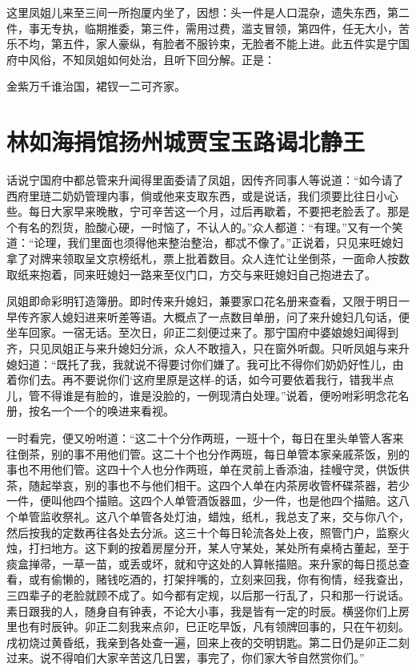 这里凤姐儿来至三间一所抱厦内坐了，因想：头一件是人口混杂，遗失东西，第二件，事无专执，临期推委，第三件，需用过费，滥支冒领，第四件，任无大小，苦乐不均，第五件，家人豪纵，有脸者不服钤束，无脸者不能上进。此五件实是宁国府中风俗，不知凤姐如何处治，且听下回分解。正是：

金紫万千谁治国，裙钗一二可齐家。

\chapter{林如海捐馆扬州城\ttlbreak 贾宝玉路谒北静王}

话说宁国府中都总管来升闻得里面委请了凤姐，因传齐同事人等说道：“如今请了西府里琏二奶奶管理内事，倘或他来支取东西，或是说话，我们须要比往日小心些。每日大家早来晚散，宁可辛苦这一个月，过后再歇着，不要把老脸丢了。那是个有名的烈货，脸酸心硬，一时恼了，不认人的。”众人都道：“有理。”又有一个笑道：“论理，我们里面也须得他来整治整治，都忒不像了。”正说着，只见来旺媳妇拿了对牌来领取呈文京榜纸札，票上批着数目。众人连忙让坐倒茶，一面命人按数取纸来抱着，同来旺媳妇一路来至仪门口，方交与来旺媳妇自己抱进去了。

凤姐即命彩明钉造簿册。即时传来升媳妇，兼要家口花名册来查看，又限于明日一早传齐家人媳妇进来听差等语。大概点了一点数目单册，问了来升媳妇几句话，便坐车回家。一宿无话。至次日，卯正二刻便过来了。那宁国府中婆娘媳妇闻得到齐，只见凤姐正与来升媳妇分派，众人不敢擅入，只在窗外听觑。只听凤姐与来升媳妇道：“既托了我，我就说不得要讨你们嫌了。我可比不得你们奶奶好性儿，由着你们去。再不要说你们`这府里原是这样-的话，如今可要依着我行，错我半点儿，管不得谁是有脸的，谁是没脸的，一例现清白处理。”说着，便吩咐彩明念花名册，按名一个一个的唤进来看视。

一时看完，便又吩咐道：“这二十个分作两班，一班十个，每日在里头单管人客来往倒茶，别的事不用他们管。这二十个也分作两班，每日单管本家亲戚茶饭，别的事也不用他们管。这四十个人也分作两班，单在灵前上香添油，挂幔守灵，供饭供茶，随起举哀，别的事也不与他们相干。这四个人单在内茶房收管杯碟茶器，若少一件，便叫他四个描赔。这四个人单管酒饭器皿，少一件，也是他四个描赔。这八个单管监收祭礼。这八个单管各处灯油，蜡烛，纸札，我总支了来，交与你八个，然后按我的定数再往各处去分派。这三十个每日轮流各处上夜，照管门户，监察火烛，打扫地方。这下剩的按着房屋分开，某人守某处，某处所有桌椅古董起，至于痰盒掸帚，一草一苗，或丢或坏，就和守这处的人算帐描赔。来升家的每日揽总查看，或有偷懒的，赌钱吃酒的，打架拌嘴的，立刻来回我，你有徇情，经我查出，三四辈子的老脸就顾不成了。如今都有定规，以后那一行乱了，只和那一行说话。素日跟我的人，随身自有钟表，不论大小事，我是皆有一定的时辰。横竖你们上房里也有时辰钟。卯正二刻我来点卯，巳正吃早饭，凡有领牌回事的，只在午初刻。戌初烧过黄昏纸，我亲到各处查一遍，回来上夜的交明钥匙。第二日仍是卯正二刻过来。说不得咱们大家辛苦这几日罢，事完了，你们家大爷自然赏你们。”

